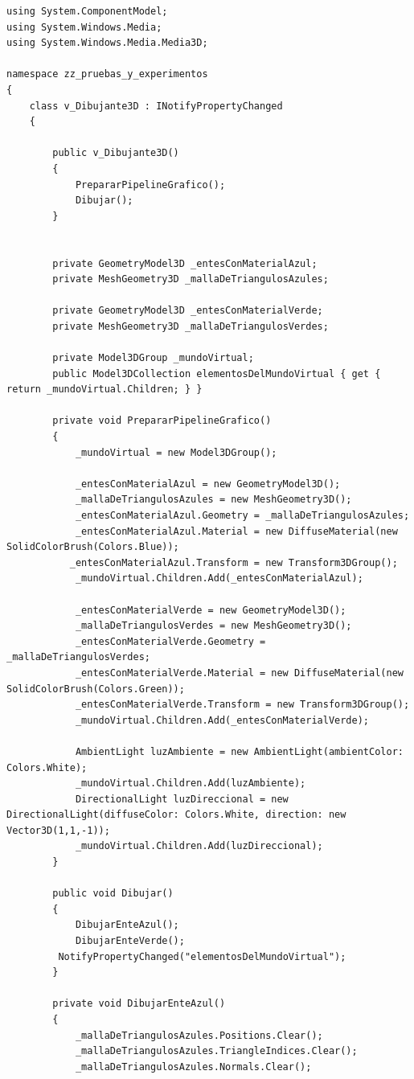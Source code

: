 \documentclass[spanish,12pt,a4paper,final,oneside]{book}
\begin{document}
\begin{lstlisting}[frame=single]
using System.ComponentModel;
using System.Windows.Media;
using System.Windows.Media.Media3D;
 
namespace zz_pruebas_y_experimentos
{
	class v_Dibujante3D : INotifyPropertyChanged
	{
 
    	public v_Dibujante3D()
    	{
            PrepararPipelineGrafico();
        	Dibujar();
    	}
 
 
    	private GeometryModel3D _entesConMaterialAzul;
    	private MeshGeometry3D _mallaDeTriangulosAzules;
 
    	private GeometryModel3D _entesConMaterialVerde;
    	private MeshGeometry3D _mallaDeTriangulosVerdes;
 
    	private Model3DGroup _mundoVirtual;
    	public Model3DCollection elementosDelMundoVirtual { get { return _mundoVirtual.Children; } }
 
    	private void PrepararPipelineGrafico()
    	{
        	_mundoVirtual = new Model3DGroup();
 
        	_entesConMaterialAzul = new GeometryModel3D();
        	_mallaDeTriangulosAzules = new MeshGeometry3D();
        	_entesConMaterialAzul.Geometry = _mallaDeTriangulosAzules;
        	_entesConMaterialAzul.Material = new DiffuseMaterial(new SolidColorBrush(Colors.Blue));
 	       _entesConMaterialAzul.Transform = new Transform3DGroup();
            _mundoVirtual.Children.Add(_entesConMaterialAzul);
 
        	_entesConMaterialVerde = new GeometryModel3D();
        	_mallaDeTriangulosVerdes = new MeshGeometry3D();
        	_entesConMaterialVerde.Geometry = _mallaDeTriangulosVerdes;
        	_entesConMaterialVerde.Material = new DiffuseMaterial(new SolidColorBrush(Colors.Green));
        	_entesConMaterialVerde.Transform = new Transform3DGroup();
            _mundoVirtual.Children.Add(_entesConMaterialVerde);
 
        	AmbientLight luzAmbiente = new AmbientLight(ambientColor: Colors.White);
            _mundoVirtual.Children.Add(luzAmbiente);
        	DirectionalLight luzDireccional = new DirectionalLight(diffuseColor: Colors.White, direction: new Vector3D(1,1,-1));
            _mundoVirtual.Children.Add(luzDireccional);
        }
 
    	public void Dibujar()
    	{
        	DibujarEnteAzul();
        	DibujarEnteVerde();
   	     NotifyPropertyChanged("elementosDelMundoVirtual");
    	}
 
    	private void DibujarEnteAzul()
    	{
            _mallaDeTriangulosAzules.Positions.Clear();
            _mallaDeTriangulosAzules.TriangleIndices.Clear();
        	_mallaDeTriangulosAzules.Normals.Clear();
 

\end{lstlisting}
\end{document}
